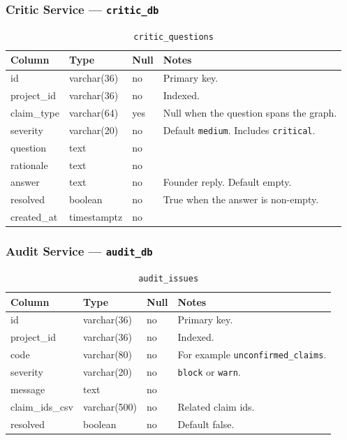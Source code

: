 \documentclass[11pt,a4paper]{article}
\begin{document}
\subsubsection{Critic Service --- \texttt{critic\_db}}

\begin{table}[ht]
\centering
\caption{\texttt{critic\_questions}}
\small
\begin{tabular}{@{}llll@{}}
\toprule
\textbf{Column} & \textbf{Type} & \textbf{Null} & \textbf{Notes} \\
\midrule
id & varchar(36) & no & Primary key. \\
project\_id & varchar(36) & no & Indexed. \\
claim\_type & varchar(64) & yes & Null when the question spans the graph. \\
severity & varchar(20) & no & Default \texttt{medium}. Includes \texttt{critical}. \\
question & text & no & \\
rationale & text & no & \\
answer & text & no & Founder reply. Default empty. \\
resolved & boolean & no & True when the answer is non-empty. \\
created\_at & timestamptz & no & \\
\bottomrule
\end{tabular}
\end{table}

\subsubsection{Audit Service --- \texttt{audit\_db}}

\begin{table}[ht]
\centering
\caption{\texttt{audit\_issues}}
\small
\begin{tabular}{@{}llll@{}}
\toprule
\textbf{Column} & \textbf{Type} & \textbf{Null} & \textbf{Notes} \\
\midrule
id & varchar(36) & no & Primary key. \\
project\_id & varchar(36) & no & Indexed. \\
code & varchar(80) & no & For example \texttt{unconfirmed\_claims}. \\
severity & varchar(20) & no & \texttt{block} or \texttt{warn}. \\
message & text & no & \\
claim\_ids\_csv & varchar(500) & no & Related claim ids. \\
resolved & boolean & no & Default false. \\
\bottomrule
\end{tabular}
\end{table}
\end{document}
